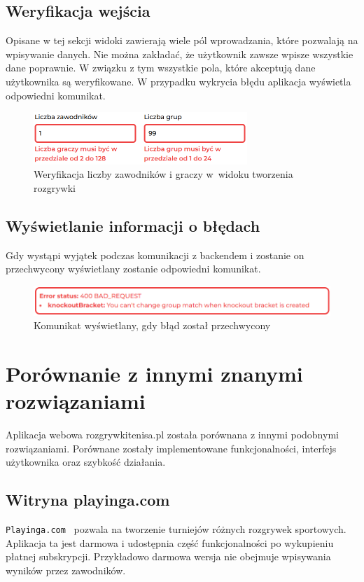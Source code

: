 \documentclass[shortabstract]{iithesis}
\begin{document}
\subsection{Weryfikacja wejścia}
Opisane w tej sekcji widoki zawierają wiele pól wprowadzania, które pozwalają na wpisywanie danych.
Nie można zakładać, że użytkownik zawsze wpisze wszystkie dane poprawnie.
W związku z tym wszystkie pola, które akceptują dane użytkownika są weryfikowane.
W przypadku wykrycia błędu aplikacja wyświetla odpowiedni komunikat.
\begin{figure}[H]
    \centering
    \includegraphics[width=0.72\textwidth,valign=t]{assets/interfejs/weryfikacja_wejscia.png}
    \caption{Weryfikacja liczby zawodników i graczy w~widoku tworzenia rozgrywki}
\end{figure}

\subsection{Wyświetlanie informacji o błędach}
Gdy wystąpi wyjątek podczas komunikacji z backendem i zostanie on przechwycony wyświetlany zostanie odpowiedni komunikat.
\begin{figure}[H]
    \centering
    \includegraphics[width=\textwidth,valign=t]{assets/interfejs/rozgrywki_error.png}
    \caption{Komunikat wyświetlany, gdy błąd został przechwycony}
\end{figure}

\section{Porównanie z innymi znanymi rozwiązaniami}
Aplikacja webowa rozgrywkitenisa.pl została porównana z innymi podobnymi rozwiązaniami.
Porównane zostały implementowane funkcjonalności, interfejs użytkownika oraz szybkość działania.

\subsection{Witryna playinga.com}
\texttt{Playinga.com}~\cite{Playinga} pozwala na tworzenie turniejów różnych rozgrywek sportowych.
Aplikacja ta jest darmowa i udostępnia część funkcjonalności po wykupieniu płatnej subskrypcji.
Przykładowo darmowa wersja nie obejmuje wpisywania wyników przez zawodników.
\end{document}
